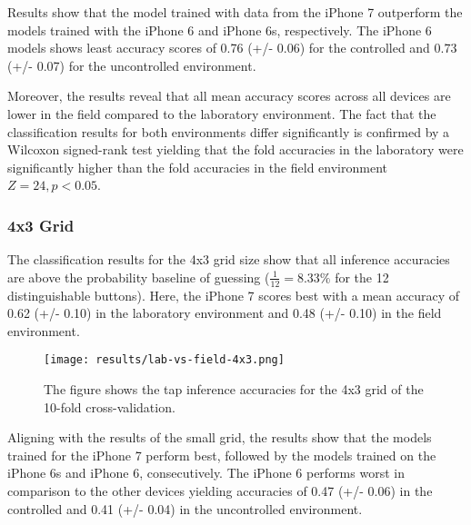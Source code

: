 Results show that the model trained with data from the iPhone 7 outperform the models trained with the iPhone 6 and iPhone 6s, respectively. The iPhone 6 models shows least accuracy scores of 0.76 (+/- 0.06) for the controlled and 0.73 (+/- 0.07) for the uncontrolled environment.


Moreover, the results reveal that all mean accuracy scores across all devices are lower in the field compared to the laboratory environment. The fact that the classification results for both environments differ significantly is confirmed by a Wilcoxon signed-rank test yielding that the fold accuracies in the laboratory were significantly higher than the fold accuracies in the field environment $Z = 24, p < 0.05$.

\subsubsection{4x3 Grid}

The classification results for the 4x3 grid size show that all inference accuracies are above the probability baseline of guessing ($\frac{1}{12}= 8.33\%$ for the 12 distinguishable buttons). Here, the iPhone 7 scores best with a mean accuracy of 0.62 (+/- 0.10) in the laboratory environment and 0.48 (+/- 0.10) in the field environment.

\begin{figure}[h!]
  \centering
  \texttt{[image: results/lab-vs-field-4x3.png]}
  \caption{The figure shows the tap inference accuracies for the 4x3 grid of the 10-fold cross-validation.} \label{fig:participation}
\end{figure}

Aligning with the results of the small grid, the results show that the models trained for the iPhone 7 perform best, followed by the models trained on the iPhone 6s and iPhone 6, consecutively. The iPhone 6 performs worst in comparison to the other devices yielding accuracies of 0.47 (+/- 0.06) in the controlled and 0.41 (+/- 0.04) in the uncontrolled environment.

